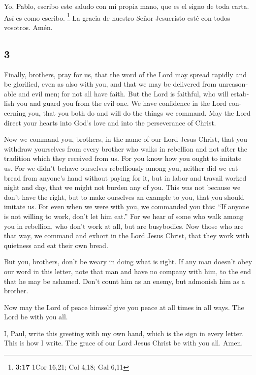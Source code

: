 \begin{paracol}{2}
 Yo, Pablo, escribo este saludo con mi propia mano, que
es el signo de toda carta. Así es como escribo. \footnote{\textbf{3:17}
  1Cor 16,21; Col 4,18; Gal 6,11}  La gracia de nuestro
Señor Jesucristo esté con todos vosotros. Amén. \switchcolumn
\begin{otherlanguage}{english}

\hypertarget{section-5}{%
\section{3}\label{section-5}}

 Finally, brothers, pray for us, that the word of the Lord
may spread rapidly and be glorified, even as also with you,
 and that we may be delivered from unreasonable and evil
men; for not all have faith.  But the Lord is faithful,
who will establish you and guard you from the evil one. 
We have confidence in the Lord concerning you, that you both do and will
do the things we command.  May the Lord direct your hearts
into God's love and into the perseverance of Christ.

 Now we command you, brothers, in the name of our Lord
Jesus Christ, that you withdraw yourselves from every brother who walks
in rebellion and not after the tradition which they received from us.
 For you know how you ought to imitate us. For we didn't
behave ourselves rebelliously among you,  neither did we
eat bread from anyone's hand without paying for it, but in labor and
travail worked night and day, that we might not burden any of you.
 This was not because we don't have the right, but to make
ourselves an example to you, that you should imitate us. 
For even when we were with you, we commanded you this: ``If anyone is
not willing to work, don't let him eat.''  For we hear of
some who walk among you in rebellion, who don't work at all, but are
busybodies.  Now those who are that way, we command and
exhort in the Lord Jesus Christ, that they work with quietness and eat
their own bread.

 But you, brothers, don't be weary in doing what is
right.  If any man doesn't obey our word in this letter,
note that man and have no company with him, to the end that he may be
ashamed.  Don't count him as an enemy, but admonish him
as a brother.

 Now may the Lord of peace himself give you peace at all
times in all ways. The Lord be with you all.

 I, Paul, write this greeting with my own hand, which is
the sign in every letter. This is how I write.  The grace
of our Lord Jesus Christ be with you all. Amen.
\end{otherlanguage} \end{paracol}
